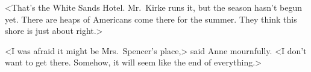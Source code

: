 <That's the White Sands Hotel. Mr.~Kirke runs it, but the season hasn't begun yet. There are heaps of Americans come there for the summer. They think this shore is just about right.>

<I was afraid it might be Mrs.~Spencer's place,> said Anne mournfully. <I don't want to get there. Somehow, it will seem like the end of everything.>